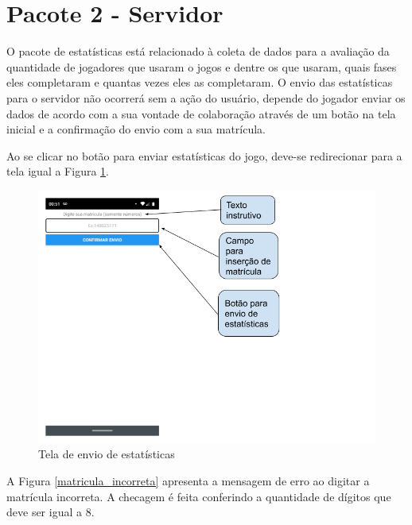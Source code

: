 \section[Pacote 2 - Servidor]{Pacote 2 - Servidor}
O pacote de estatísticas está relacionado à coleta de dados para a avaliação da quantidade de jogadores que usaram o jogos e dentre os que usaram, quais fases eles completaram e quantas vezes eles as completaram. O envio das estatísticas para o servidor não ocorrerá sem a ação do usuário, depende do jogador enviar os dados de acordo com a sua vontade de colaboração através de um botão na tela inicial e a confirmação do envio com a sua matrícula.

Ao se clicar no botão para enviar estatísticas do jogo, deve-se redirecionar para a tela igual a Figura \ref{envio_estatisticas}.


\begin{figure}[H]
\centering
\caption{Tela de envio de estatísticas}
\includegraphics[scale=0.5]{figuras/estatisticas/envio_estatisticas.png}

\label{envio_estatisticas}
\end{figure}

A Figura \ref{matricula_incorreta} apresenta a mensagem de erro ao digitar a matrícula incorreta. A checagem é feita conferindo a quantidade de dígitos que deve ser igual a 8.


